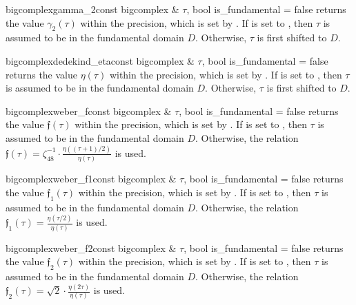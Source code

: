 \begin{fcode}{bigcomplex}{gamma_2}{const bigcomplex & $\tau$, bool is_fundamental = false}
  returns the value $\gamma_2(\tau)$ within the precision, which is set by
  . If  is set to
  , then $\tau$ is assumed to be in the fundamental domain $D.$
  Otherwise, $\tau$ is first shifted to $D.$
\end{fcode}

\begin{fcode}{bigcomplex}{dedekind_eta}{const bigcomplex & $\tau$, bool is_fundamental = false}
  returns the value $\eta(\tau)$ within the precision, which is set by
  . If  is set to
  , then $\tau$ is assumed to be in the fundamental domain $D.$
  Otherwise, $\tau$ is first shifted to $D.$
\end{fcode}

\begin{fcode}{bigcomplex}{weber_f}{const bigcomplex & $\tau$, bool is_fundamental = false}
  returns the value $\mathfrak{f}(\tau)$ within the precision, which is set by
  . If  is set to
  , then $\tau$ is assumed to be in the fundamental domain $D.$
  Otherwise, the relation $\mathfrak{f}(\tau)=\zeta_{48}^{-1}\cdot\frac{\eta((\tau+1)/2)}{\eta(\tau)}$ is used.
\end{fcode}

\begin{fcode}{bigcomplex}{weber_f1}{const bigcomplex & $\tau$, bool is_fundamental = false}
  returns the value $\mathfrak{f}_1(\tau)$ within the precision,
  which is set by . If  is set to
  , then $\tau$ is assumed to be in the fundamental domain $D.$
  Otherwise, the relation
  $\mathfrak{f}_1(\tau)=\frac{\eta(\tau/2)}{\eta(\tau)}$ is used.
\end{fcode}

\begin{fcode}{bigcomplex}{weber_f2}{const bigcomplex & $\tau$, bool is_fundamental = false}
  returns the value $\mathfrak{f}_2(\tau)$ within the precision,
  which is set by . If  is set to
  , then $\tau$ is assumed to be in the fundamental domain $D.$
  Otherwise, the relation
  $\mathfrak{f}_2(\tau)=\sqrt{2}\cdot\frac{\eta(2\tau)}{\eta(\tau)}$ is used.
\end{fcode}



